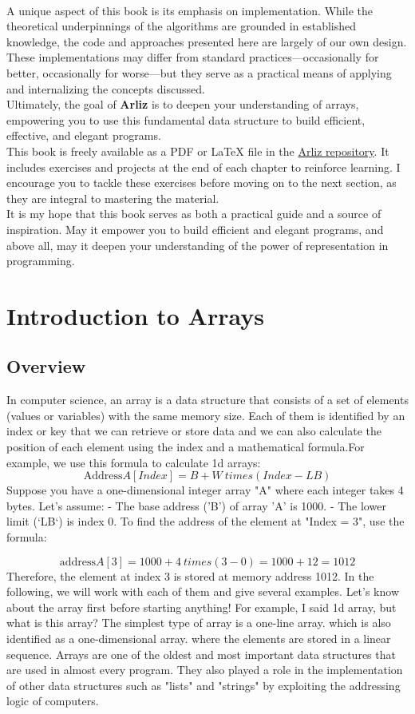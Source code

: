 \documentclass[12pt, oneside]{book}
\begin{document}
\\A unique aspect of this book is its emphasis on implementation. While the theoretical underpinnings of the algorithms are grounded in established knowledge, the code and approaches presented here are largely of our own design. These implementations may differ from standard practices—occasionally for better, occasionally for worse—but they serve as a practical means of applying and internalizing the concepts discussed. \\
Ultimately, the goal of \textbf{Arliz} is to deepen your understanding of arrays, empowering you to use this fundamental data structure to build efficient, effective, and elegant programs. \\
This book is freely available as a PDF or LaTeX file in the \href{https://github.com/m-mdy-m/Arliz}{Arliz repository}. It includes exercises and projects at the end of each chapter to reinforce learning. I encourage you to tackle these exercises before moving on to the next section, as they are integral to mastering the material.\\ It is my hope that this book serves as both a practical guide and a source of inspiration. May it empower you to build efficient and elegant programs, and above all, may it deepen your understanding of the power of representation in programming.

\chapter{Introduction to Arrays}
	
\section{Overview}
In computer science, an array is a data structure that consists of a set of elements (values ​​or variables) with the same memory size. Each of them is identified by an index or key that we can retrieve or store data and we can also calculate the position of each element using the index and a mathematical formula.For example, we use this formula to calculate 1d arrays:
\[\text{Address} A[Index] = B + W \ times (Index - LB)\]
Suppose you have a one-dimensional integer array "A" where each integer takes 4 bytes. Let's assume:
- The base address ('B') of array 'A' is 1000.
- The lower limit (`LB`) is index 0.
To find the address of the element at "Index = 3", use the formula:

\[\text{address} A[3] = 1000 + 4 \ times (3 - 0) = 1000 + 12 = 1012\]
Therefore, the element at index 3 is stored at memory address 1012.
In the following, we will work with each of them and give several examples. Let's know about the array first before starting anything!
For example, I said 1d array, but what is this array?
The simplest type of array is a one-line array. which is also identified as a one-dimensional array. where the elements are stored in a linear sequence. Arrays are one of the oldest and most important data structures that are used in almost every program. They also played a role in the implementation of other data structures such as "lists" and "strings" by exploiting the addressing logic of computers.
\end{document}
